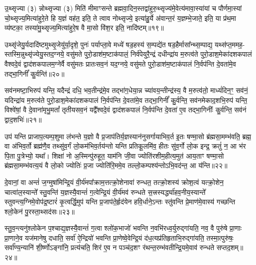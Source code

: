 {\anuvakamend[{उ॒दच॒त्युद्ये\-ऽह॑रा॒प्त्वा पञ्च॑दश च॥६॥}]}

उ॒थ्सृज्या (३) न्नोथ्सृज्या (३) मिति॑ मीमाꣳसन्ते ब्रह्मवा॒दिन॒स्तद्वा॑हुरु॒थ्सृज्य॑मे॒वेत्य॑मावा॒स्या॑यां च पौर्णमा॒स्यां चो॒थ्सृज्य॒मित्या॑हुरे॒ते हि य॒ज्ञं वह॑त॒ इति॒ ते त्वाव नोथ्सृज्ये॒ इत्या॑हु॒र्ये अ॑वान्त॒रं य॒ज्ञम्भे॒जाते॒ इति॒ या प्र॑थ॒मा व्य॑ष्टका॒ तस्या॑मु॒थ्सृज्य॒मित्या॑हुरे॒ष वै मा॒सो वि॑श॒र इति॒ नादि॑ष्टम्॥१९॥

उथ्सृ॑जेयु॒र्यदादि॑ष्टमुथ्सृ॒जेयु॑र्या॒दृशे॒ पुनः॑ पर्याप्ला॒वे मध्ये॑ षड॒हस्य॑ स॒म्पद्ये॑त षड॒हैर्मासा᳚न्थ्स॒म्पाद्य॒ यथ्स॑प्त॒ममह॒- स्तस्मि॒न्नुथ्सृ॑ज्येयु॒स्तद॒ग्नये॒ वसु॑मते पुरो॒डाश॑म॒ष्टाक॑पालं॒ निर्व॑पेयुरै॒न्द्रं दधीन्द्रा॑य म॒रुत्व॑ते पुरो॒डाश॒मेका॑दशकपालं वैश्वदे॒वं द्वाद॑शकपालम॒ग्नेर्वै वसु॑मतः प्रातःसव॒नं यद॒ग्नये॒ वसु॑मते पुरो॒डाश॑म॒ष्टाक॑पालं नि॒र्वप॑न्ति दे॒वता॑मे॒व तद्भा॒गिनीं᳚ कु॒र्वन्ति॑॥२०॥

सव॑नमष्टा॒भिरुप॑ यन्ति॒ यदैन्द्रं दधि॒ भव॒तीन्द्र॑मे॒व तद्भा॑ग॒धेया॒न्न च्या॑वय॒न्तीन्द्र॑स्य॒ वै म॒रुत्व॑तो॒ माध्यं॑दिन॒ꣳ॒ सव॑नं॒ यदिन्द्रा॑य म॒रुत्व॑ते पुरो॒डाश॒मेका॑दशकपालं नि॒र्वप॑न्ति दे॒वता॑मे॒व तद्भा॒गिनीं᳚ कु॒र्वन्ति॒ सव॑नमेकाद॒शभि॒रुप॑ यन्ति॒ विश्वे॑षां॒ वै दे॒वाना॑मृभु॒मतां᳚ तृतीयसव॒नं यद्वै᳚श्वदे॒वं द्वाद॑शकपालं नि॒र्वप॑न्ति दे॒वता॑ ए॒व तद्भा॒गिनीः᳚ कु॒र्वन्ति॒ सव॑नं द्वाद॒शभिः॑॥२१॥

उप॑ यन्ति प्राजाप॒त्यम्प॒शुमा ल॑भन्ते य॒ज्ञो वै प्र॒जाप॑तिर्य॒ज्ञस्यान॑नुसर्गायाभिव॒र्त इ॒तः षण्मा॒सो ब्र॑ह्मसा॒मम्भ॑वति॒ ब्रह्म॒ वा अ॑भिव॒र्तो ब्रह्म॑णै॒व तथ्सु॑व॒र्गं लो॒कम॑भिव॒र्तय॑न्तो यन्ति प्रतिकू॒लमि॑व॒ हीतः सु॑व॒र्गो लो॒क इन्द्र॒ क्रतुं॑ न॒ आ भ॑र पि॒ता पु॒त्रेभ्यो॒ यथा᳚। शिक्षा॑ नो अ॒स्मिन्पु॑रुहूत॒ याम॑नि जी॒वा ज्योति॑रशीम॒हीत्य॒मुत॑ आय॒ताꣳ षण्मा॒सो ब्र॑ह्मसा॒मम्भ॑वत्य॒यं वै लो॒को ज्योतिः॑ प्र॒जा ज्योति॑रि॒ममे॒व तल्लो॒कम्पश्य॑न्तो\-ऽभि॒वद॑न्त॒ आ य॑न्ति॥२२॥

{\anuvakamend[{नादि॑ष्टङ्कु॒र्वन्ति॑ द्वाद॒शभि॒रिति॑ विꣳश॒तिश्च॑॥७॥}]}

दे॒वानां॒ वा अन्तं॑ ज॒ग्मुषा॑मिन्द्रि॒यं वी॒र्य॑मपा᳚क्राम॒त्तत्क्रो॒शेनावा॑ रुन्धत॒ तत्क्रो॒शस्य॑ क्रोश॒त्वं यत्क्रो॒शेन॒ चात्वा॑ल॒स्यान्ते᳚ स्तु॒वन्ति॑ य॒ज्ञस्यै॒वान्तं॑ ग॒त्वेन्द्रि॒यं वी॒र्य॑मव॑ रुन्धते स॒त्त्रस्यर्द्ध्या॑हव॒नीय॒स्यान्ते᳚ स्तुवन्त्य॒ग्निमे॒वोप॑द्र॒ष्टारं॑ कृ॒त्वर्द्धि॒मुप॑ यन्ति प्र॒जाप॑ते॒र्\mbox{}हृद॑येन हवि॒र्धाने॒\-ऽन्तः स्तु॑वन्ति प्रे॒माण॑मे॒वास्य॑ गच्छन्ति श्लो॒केन॑ पु॒रस्ता॒थ्सद॑सः॥२३॥

स्तु॒व॒न्त्यनु॑श्लोकेन प॒श्चाद्य॒ज्ञस्यै॒वान्तं॑ ग॒त्वा श्लो॑क॒भाजो॑ भवन्ति न॒वभि॑रध्व॒र्युरुद्गा॑यति॒ नव॒ वै पुरु॑षे प्रा॒णाः प्रा॒णाने॒व यज॑मानेषु दधाति॒ सर्वा॑ ऐ॒न्द्रियो॑ भवन्ति प्रा॒णेष्वे॒वेन्द्रि॒यं द॑ध॒त्यप्र॑तिहृताभि॒रुद्गा॑यति॒ तस्मा॒त्पुरु॑षः॒ सर्वा᳚ण्य॒न्यानि॑ शी॒र्ष्णो\-ऽङ्गा॑नि॒ प्रत्य॑चति॒ शिर॑ ए॒व न पञ्च॑द॒शꣳ र॑थन्त॒रम्भ॑वतीन्द्रि॒यमे॒वाव॑ रुन्धते सप्तद॒शम्॥२४॥

